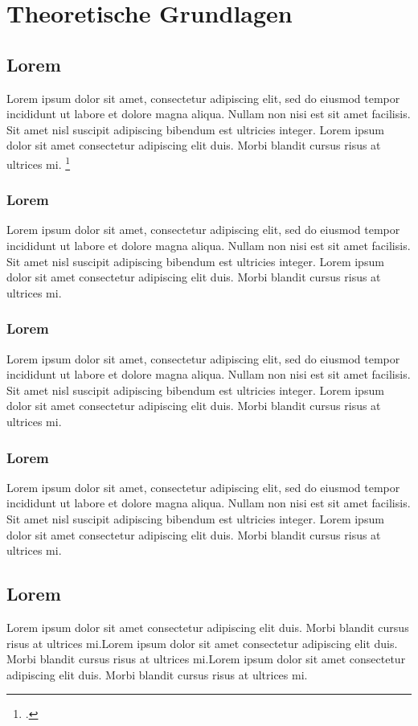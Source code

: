 \section{Theoretische Grundlagen}\label{theoretische_grundlagen}\thispagestyle{FooBar}
\subsection{Lorem}
Lorem ipsum dolor sit amet, consectetur adipiscing elit, sed do eiusmod tempor incididunt ut labore et dolore magna aliqua. Nullam non nisi est sit amet facilisis. Sit amet nisl suscipit adipiscing bibendum est ultricies integer. Lorem ipsum dolor sit amet consectetur adipiscing elit duis. Morbi blandit cursus risus at ultrices mi.  \footcite[10]{Vogel.2005}
\subsubsection{Lorem}
Lorem ipsum dolor sit amet, consectetur adipiscing elit, sed do eiusmod tempor incididunt ut labore et dolore magna aliqua. Nullam non nisi est sit amet facilisis. Sit amet nisl suscipit adipiscing bibendum est ultricies integer. Lorem ipsum dolor sit amet consectetur adipiscing elit duis. Morbi blandit cursus risus at ultrices mi. \textcite[10]{Vogel.2005}
\subsubsection{Lorem}
Lorem ipsum dolor sit amet, consectetur adipiscing elit, sed do eiusmod tempor incididunt ut labore et dolore magna aliqua. Nullam non nisi est sit amet facilisis. Sit amet nisl suscipit adipiscing bibendum est ultricies integer. Lorem ipsum dolor sit amet consectetur adipiscing elit duis. Morbi blandit cursus risus at ultrices mi.
\subsubsection{Lorem}
Lorem ipsum dolor sit amet, consectetur adipiscing elit, sed do eiusmod tempor incididunt ut labore et dolore magna aliqua. Nullam non nisi est sit amet facilisis. Sit amet nisl suscipit adipiscing bibendum est ultricies integer. Lorem ipsum dolor sit amet consectetur adipiscing elit duis. Morbi blandit cursus risus at ultrices mi. 
\newpage
\subsection{Lorem}
Lorem ipsum dolor sit amet consectetur adipiscing elit duis. Morbi blandit cursus risus at ultrices mi.Lorem ipsum dolor sit amet consectetur adipiscing elit duis. Morbi blandit cursus risus at ultrices mi.Lorem ipsum dolor sit amet consectetur adipiscing elit duis. Morbi blandit cursus risus at ultrices mi.
